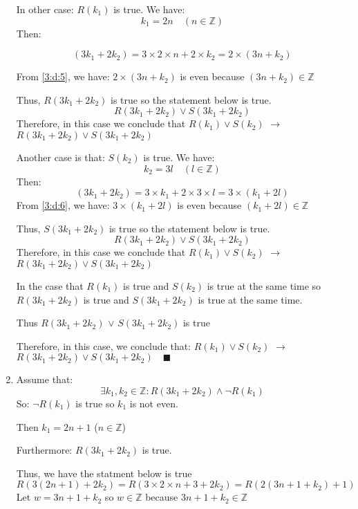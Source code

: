 \documentclass{article}
\renewcommand{\a}{\land}
\renewcommand{\o}{\lor}
\newcommand{\n}{\neg}
\begin{document}
\begin{enumerate}[label=({\alph*})]
		In other case: \(R({k_1})\) is true.
		We have: 
		\[{k_1} = 2n \quad (n \in \mathbb{Z})\]
		Then:
		
		
		\begin{equation}
				(3{k_1} + 2{k_2}) = 3 \times 2 \times n + 2 \times k_2 = 2 \times (3n + {k_2})   \label{3:d:5}
		\end{equation}

		From \eqref{3:d:5}, we have: \( 2 \times (3n + {k_2})\) is even because $(3n + {k_2}) \in \mathbb{Z}$

		Thus, \(R(3{k_1} + 2{k_2})\) is true so the statement below is true.
		$$ R(3{k_1} + 2{k_2}) \o S(3{k_1} + 2{k_2})$$ 
		Therefore, in this case we conclude that $R({k_1}) \o  S({k_2})$ $\to$ $ R(3{k_1} + 2{k_2}) \o S(3{k_1} + 2{k_2})$

		Another case is that: $S({k_2})$ is true.
		We have:
		\[{k_2} = 3l \quad (l \in \mathbb{Z})\]
		Then:
		\begin{equation}
			(3{k_1} + 2{k_2}) = 3 \times{k_1} + 2 \times 3 \times l = 3 \times ({k_1} + 2l)   \label{3:d:6}
		\end{equation}
		From \eqref{3:d:6}, we have: $ 3 \times ({k_1} + 2l) $  is even because $({k_1} + 2l) \in \mathbb{Z}$

		Thus, \(S(3{k_1} + 2{k_2})\) is true so the statement below is true.
		$$ R(3{k_1} + 2{k_2}) \o S(3{k_1} + 2{k_2})$$ 
		Therefore, in this case we conclude that $R({k_1}) \o  S({k_2})$ $\to$ $ R(3{k_1} + 2{k_2}) \o S(3{k_1} + 2{k_2})$

		In the case that \(R({k_1})\) is true and $S({k_2})$ is true at the same time so \(R(3{k_1} + 2{k_2})\) is true and  \(S(3{k_1} + 2{k_2})\) is true at the same time.

		Thus \(R(3{k_1} + 2{k_2})\) \(\o\) \(S(3{k_1} + 2{k_2})\) is true

		Therefore, in this case, we conclude that: $R({k_1}) \o  S({k_2})$ $\to$ $ R(3{k_1} + 2{k_2}) \o S(3{k_1} + 2{k_2}) \quad \blacksquare$

		\item Assume that:
				$$ \exists {k_1}, {k_2} \in \mathbb{Z}: R(3{k_1} + 2{k_2}) \a \n R(k_1)$$
			So: $ \n R({k_1})$ is true so ${k_1}$ is not even.
			
			Then \({k_1} = 2n + 1\) ($ n  \in \mathbb{Z}$)

			Furthermore: \( R(3{k_1} + 2{k_2})\) is true.

			Thus, we have the statment below is true
			\begin{equation}
				R(3(2n + 1) + 2{k_2}) = R(3 \times 2 \times n + 3 + 2{k_2}) = R( 2(3n + 1 + {k_2}) + 1) \label{3:f:1}
			\end{equation}
			Let \(w = 3n + 1 + k_2\) so \(w \in \mathbb{Z}\) because \(3n + 1 + k_2 \in \mathbb{Z}\)


\end{enumerate}
\end{document}
